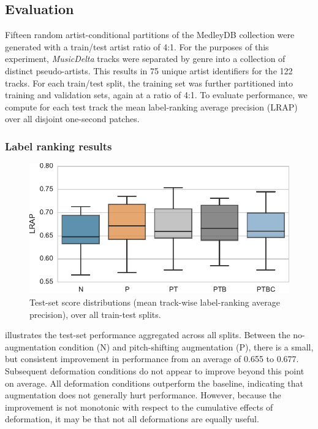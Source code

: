 \documentclass{article}
\begin{document}
\subsection{Evaluation}

Fifteen random artist-conditional partitions of the MedleyDB collection were generated with
a train/test artist ratio of 4:1.  For the purposes of this experiment,
\emph{MusicDelta} tracks were separated by genre into a collection of distinct 
pseudo-artists. 
This results in 75 unique artist identifiers for the 122 tracks.
For each train/test split, the training set was further partitioned into
training and validation sets, again at a ratio of 4:1.
To evaluate performance, we compute for each test track the mean label-ranking average
precision (LRAP) over all disjoint one-second patches.


\subsubsection{Label ranking results}
\begin{figure}
    \centering
    \includegraphics[width=\columnwidth]{figs/lrapall}
    \caption{Test-set score distributions (mean track-wise label-ranking average
        precision), over all train-test splits.\label{lrapresults}}
\end{figure}

 illustrates the test-set performance aggregated across all splits. 
Between the no-augmentation condition (N) and pitch-shifting augmentation (P), 
there is a small, but consistent improvement in performance from an average of 0.655 to
0.677.
Subsequent deformation conditions do not appear to improve beyond this point on average.
All deformation conditions outperform the baseline, indicating that augmentation 
does not generally hurt performance.  However, because the improvement is not monotonic
with respect to the cumulative effects of deformation, it may be that not all deformations 
are equally useful.
\end{document}
